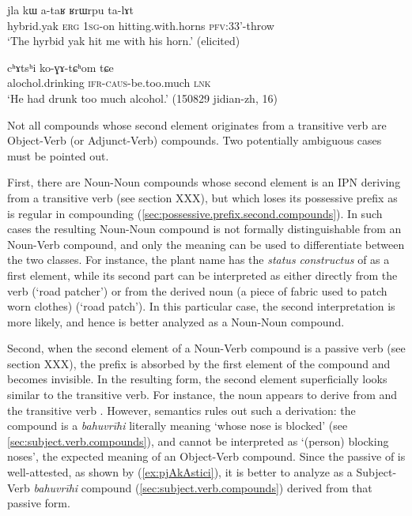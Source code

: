 \begin{exe}
\ex \label{ex:RrWrpu}
 \gll jla kɯ a-taʁ ʁrɯrpu ta-lɤt \\
 hybrid.yak \textsc{erg} \textsc{1sg}-on hitting.with.horns \textsc{pfv}:3\fl{}3'-throw \\
 \glt `The hyrbid yak hit me with his horn.' (elicited)
\end{exe}

\begin{exe}
\ex \label{ex:chAtshi.koGAtChom}
 \gll cʰɤtsʰi ko-ɣɤ-tɕʰom tɕe  \\
 alochol.drinking \textsc{ifr}-\textsc{caus}-be.too.much \textsc{lnk} \\
\glt `He had drunk too much alcohol.' (150829 jidian-zh, 16)
\end{exe}
Not all compounds whose second element originates from a transitive verb are Object-Verb (or Adjunct-Verb) compounds. Two potentially ambiguous cases must be pointed out. 

First, there are Noun-Noun compounds whose second element is an IPN deriving from a transitive verb (see section XXX), but which loses its possessive prefix as is regular in compounding (\ref{sec:possessive.prefix.second.compounds}). In such cases the resulting Noun-Noun compound is not formally distinguishable from an Noun-Verb compound, and only the meaning can be used to differentiate between the two classes. For instance, the plant name  has the \textit{status constructus} of  as a first element, while its second part  can be interpreted as either directly from the verb  (`road patcher') or from the derived noun  (a piece of fabric used to patch worn clothes) (`road patch'). In this particular case, the second interpretation is more likely, and hence  is better analyzed as a Noun-Noun compound.

Second, when the second element of a Noun-Verb compound is a  passive verb (see section XXX), the  prefix is absorbed by the first element of the compound and becomes invisible. In the resulting form, the second element superficially looks similar to the transitive verb. For instance, the noun  appears to derive from  and the transitive verb  . However, semantics rules out such a derivation: the compound is a \textit{bahuvrīhi} literally meaning `whose nose is blocked' (see \ref{sec:subject.verb.compounds}), and cannot be interpreted as `(person) blocking noses', the expected meaning of an Object-Verb compound. Since the passive  of   is well-attested, as shown by (\ref{ex:pjAkAstici}), it is better to analyze  as a Subject-Verb \textit{bahuvrīhi} compound (\ref{sec:subject.verb.compounds}) derived from that passive form.

